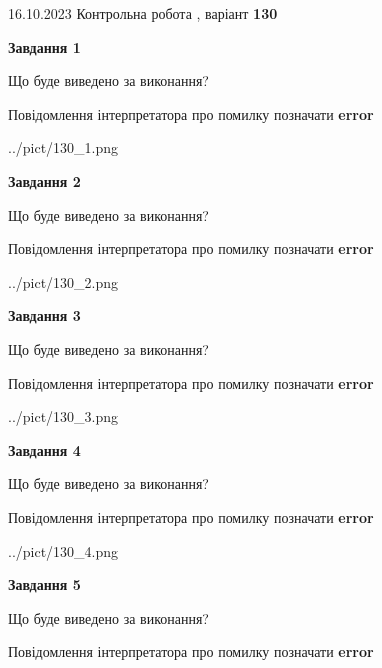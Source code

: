 \documentclass[12pt, ukrainian]{article}
\begin{document}
{\Large{16.10.2023 Контрольна робота , варіант  \No \textbf { 130 }\par}}
{
\begin {large}
{\begin {center}\textbf{Завдання 1}\end {center}}\par
Що буде виведено за виконання? \par
Повідомлення інтерпретатора про помилку позначати \textbf{error}

\begin{center}
	{../pict/130_1.png}
\end{center}
\newpage

{\begin {center}\textbf{Завдання 2}\end {center}}\par
Що буде виведено за виконання? \par
Повідомлення інтерпретатора про помилку позначати \textbf{error}

\begin{center}
	{../pict/130_2.png}
\end{center}
\newpage

{\begin {center}\textbf{Завдання 3}\end {center}}\par
Що буде виведено за виконання? \par
Повідомлення інтерпретатора про помилку позначати \textbf{error}

\begin{center}
	{../pict/130_3.png}
\end{center}
\newpage

{\begin {center}\textbf{Завдання 4}\end {center}}\par
Що буде виведено за виконання? \par
Повідомлення інтерпретатора про помилку позначати \textbf{error}

\begin{center}
	{../pict/130_4.png}
\end{center}
\newpage

{\begin {center}\textbf{Завдання 5}\end {center}}\par
Що буде виведено за виконання? \par
Повідомлення інтерпретатора про помилку позначати \textbf{error}


\end{large}}
\end{document}

